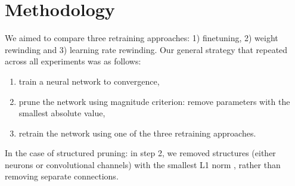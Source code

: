 

\section{Methodology}


We aimed to compare three retraining approaches: 1) finetuning, 2) weight rewinding and 3) learning rate rewinding. Our general strategy that repeated across all experiments was as follows:
\begin{enumerate}
    \item train a neural network to convergence,
    \item prune the network using magnitude criterion: remove parameters with the smallest absolute value,
    \item retrain the network using one of the three retraining approaches.
\end{enumerate}

In the case of structured pruning: in step 2, we removed structures (either neurons or convolutional channels) with the smallest L1 norm \cite{structured}, rather than removing separate connections. 

